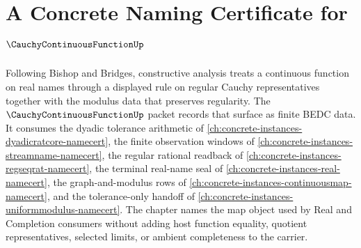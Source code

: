 \chapter{A Concrete Naming Certificate for $\CauchyContinuousFunctionUp$}
\label{ch:concrete-instances-cauchy-continuous-function-namecert}

Following Bishop and Bridges, constructive analysis treats a continuous function on real names through a displayed rule on regular Cauchy representatives together with the modulus data that preserves regularity. The $\CauchyContinuousFunctionUp$ packet records that surface as finite BEDC data. It consumes the dyadic tolerance arithmetic of \autoref{ch:concrete-instances-dyadicratcore-namecert}, the finite observation windows of \autoref{ch:concrete-instances-streamname-namecert}, the regular rational readback of \autoref{ch:concrete-instances-regseqrat-namecert}, the terminal real-name seal of \autoref{ch:concrete-instances-real-namecert}, the graph-and-modulus rows of \autoref{ch:concrete-instances-continuousmap-namecert}, and the tolerance-only handoff of \autoref{ch:concrete-instances-uniformmodulus-namecert}. The chapter names the map object used by Real and Completion consumers without adding host function equality, quotient representatives, selected limits, or ambient completeness to the carrier.

